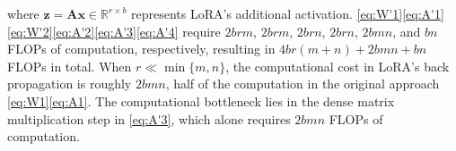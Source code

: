 where $\mathbf{z}=\mathbf{A}\mathbf{x}\in\mathbb{R}^{r\times b}$ represents LoRA's additional activation. \eqref{eq:W'1}\eqref{eq:A'1}\eqref{eq:W'2}\eqref{eq:A'2}\eqref{eq:A'3}\eqref{eq:A'4} require $2brm$, $2brm$, $2brn$, $2brn$, $2bmn$, and $bn$ FLOPs of computation, respectively, resulting in $4br(m+n)+2bmn+bn$ FLOPs in total. When $r\ll\min\{m,n\}$, the computational cost in LoRA's back propagation is roughly $2bmn$, half of the computation in the original approach \eqref{eq:W1}\eqref{eq:A1}. The computational bottleneck lies in the dense matrix multiplication step in \eqref{eq:A'3}, which alone requires $2bmn$ FLOPs of computation.
